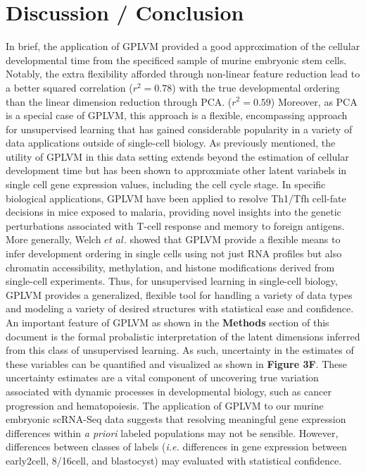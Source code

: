 \documentclass[english, 11pt]{article}\usepackage[]{graphicx}\usepackage[]{color}
\begin{document}
\section{Discussion / Conclusion}

In brief, the application of GPLVM provided a good approximation of the cellular developmental time from the specificed sample of murine embryonic stem cells. Notably, the extra flexibility afforded through non-linear feature reduction lead to a better squared correlation ($r^2 = 0.78$) with the true developmental ordering than the linear dimension reduction through PCA. ($r^2 = 0.59$) Moreover, as PCA is a special case of GPLVM, \cite{lawrence2004gaussian} this approach is a flexible, encompassing approach for unsupervised learning that has gained considerable popularity in a variety of data applications outside of single-cell biology. 
\newline \newline
As previously mentioned, the utility of GPLVM in this data setting extends beyond the estimation of cellular development time but has been shown to approxmiate other latent variabels in single cell gene expression values, including the cell cycle stage. \cite{buettner2015computational} In specific biological applications, GPLVM have been applied to resolve Th1/Tfh cell-fate decisions in mice exposed to malaria, providing novel insights into the genetic perturbations associated with T-cell response and memory to foreign antigens. \cite{lonnberg2017single} More generally, Welch $et$ $al.$ showed that GPLVM provide a flexible means to infer development ordering in single cells using not just RNA profiles but also chromatin accessibility, methylation, and histone modifications derived from single-cell experiments. \cite{welch2017manifold} Thus, for unsupervised learning in single-cell biology, GPLVM provides a generalized, flexible tool for handling a variety of data types and modeling a variety of desired structures with statistical ease and confidence.  
\newline \newline
An important feature of GPLVM as shown in the \textbf{Methods} section of this document is the formal probalistic interpretation of the latent dimensions inferred from this class of unsupervised learning. As such, uncertainty in the estimates of these variables can be quantified and visualized as shown in \textbf{Figure 3F}. These uncertainty estimates are a vital component of uncovering true variation associated with dynamic  processes in developmental biology, such as cancer progression \cite{corces2016lineage} and hematopoiesis. \cite{buenrostro2017single} The application of GPLVM to our murine embryonic scRNA-Seq data suggests that resolving meaningful gene expression differences within \textit{a priori} labeled populations may not be sensible. However, differences between classes of labels (\textit{i.e.} differences in gene expression between early2cell, 8/16cell, and blastocyst) may evaluated with statistical confidence. 
\end{document}
